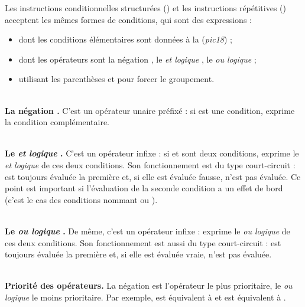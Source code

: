 

Les instructions conditionnelles structurées () et les instructions répétitives () acceptent les mêmes formes de conditions, qui sont des expressions :\begin{itemize}
  \item dont les conditions élémentaires sont données à la  (\emph{pic18}) ;
  \item dont les opérateurs sont la négation \piccolo{\!}, le \emph{et logique} \piccolo{&}, le \emph{ou logique} \piccolo{|} ;
  \item utilisant les parenthèses \piccolo{(} et \piccolo{)} pour forcer le groupement.
\end{itemize}

~\\
\textbf{La négation \piccolo{\!}.} C'est un opérateur unaire préfixé : si  est une condition,  exprime la condition complémentaire. %


~\\
\textbf{Le \emph{et logique} \piccolo{\&}.} C'est un opérateur infixe : si  et  sont deux conditions,  exprime le \emph{et logique} de ces deux conditions. Son fonctionnement est du type court-circuit :  est toujours évaluée la première et, si elle est évaluée fausse,  n'est pas évaluée. Ce point est important si l'évaluation de la seconde condition a un effet de bord (c'est le cas des conditions nommant  ou ).

~\\
\textbf{Le \emph{ou logique} \piccolo{|}.} De même, c'est un opérateur infixe :  exprime le \emph{ou logique} de ces deux conditions. Son fonctionnement est aussi du type court-circuit :  est toujours évaluée la première et, si elle est évaluée vraie,  n'est pas évaluée.

~\\
\textbf{Priorité des opérateurs.} La négation \piccolo{\!} est l'opérateur le plus prioritaire, le \emph{ou logique} \piccolo{|} le moins prioritaire. Par exemple,  est équivalent à  et  est équivalent à .

